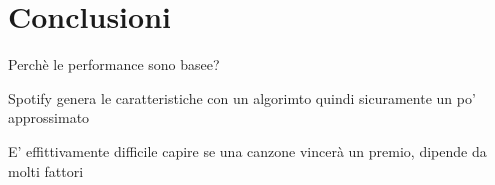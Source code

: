 \chapter{Conclusioni}

Perchè le performance sono basee?

Spotify genera le caratteristiche con un algorimto quindi sicuramente un po' approssimato

E' effittivamente difficile capire se una canzone vincerà un premio, dipende da molti fattori